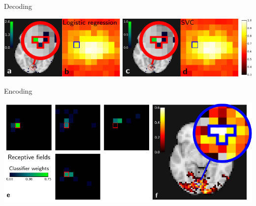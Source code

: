 \documentclass{article}
\begin{document}
\begin{preview}
    \begin{turn}{90}
        \sffamily
        \hspace{14pt}
        Decoding
    \end{turn}
    \includegraphics[width=.97\linewidth]{figure_decoding}\\
    \begin{turn}{90}
        \sffamily
        \hspace{42pt}
        Encoding
    \end{turn}
    \includegraphics[width=.975\linewidth]{figure_encoding}
\end{preview}
\end{document}

